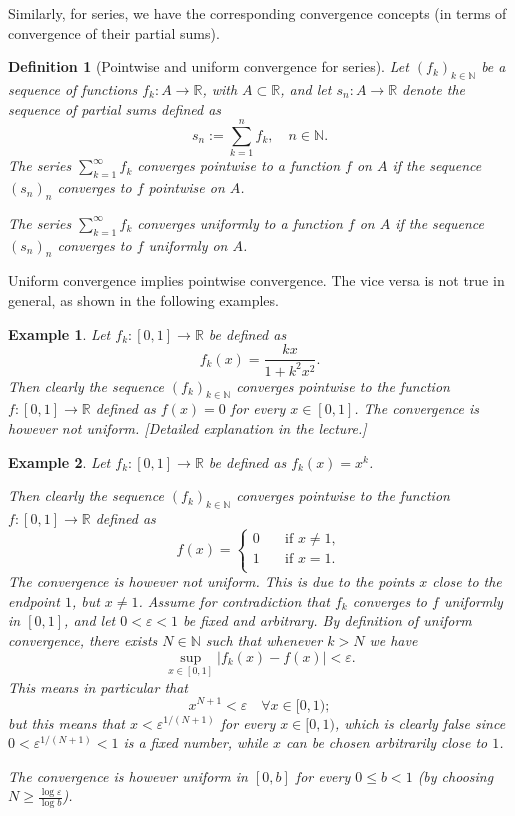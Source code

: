 \documentclass[a4paper,reqno]{amsart}
\numberwithin{equation}{section}
\newtheorem{definition}{Definition}[section]
\newtheorem{example}{Example}
\def\N{\mathbb{N}}
\def\R{\mathbb{R}}
\begin{document}
Similarly, for series, we have the corresponding convergence concepts (in terms of convergence of their partial sums). %

\begin{definition}[Pointwise and uniform convergence for series] Let $(f_k)_{k\in \mathbb{N}}$ be a sequence of functions $f_k:A \to \R$, with $A\subset \R$, and let $s_n:A\to \R$ denote the sequence of partial sums defined as
$$
s_n:= \sum_{k=1}^n f_k, \quad n\in \N.
$$
The series $\sum_{k=1}^\infty f_k$ converges pointwise to a function $f$ on $A$ if the sequence $(s_n)_n$ converges to $f$ pointwise on $A$.

The series $\sum_{k=1}^\infty f_k$ converges uniformly to a function $f$ on $A$ if the sequence $(s_n)_n$ converges to $f$ uniformly on $A$.
\end{definition}

Uniform convergence implies pointwise convergence. The vice versa is not true in general, as shown in the following examples.

\begin{example}\label{example:2}
Let $f_k: [0,1] \to \R$ be defined as
$$
f_k(x)= \frac{kx}{1+k^2x^2}.
$$
Then clearly the sequence $(f_k)_{k\in \N}$ converges pointwise to the function $f:[0,1] \to \R$ defined as $f(x) = 0$ for every $x\in [0,1]$.
The convergence is however not uniform. [Detailed explanation in the lecture.]
\end{example}


\begin{example}
Let $f_k: [0,1] \to \R$ be defined as $f_k(x)=x^k$.

Then clearly the sequence $(f_k)_{k\in \N}$ converges pointwise to the function $f:[0,1] \to \R$ defined as
$$
f(x) = \begin{cases}
0 \quad &\textrm{if } x\neq 1,\\
1 \quad &\textrm{if } x = 1.\\
\end{cases}
$$
The convergence is however not uniform. This is due to the points $x$ close to the endpoint $1$, but $x\neq 1$. Assume for contradiction that $f_k$ converges to $f$ uniformly in $[0,1]$, and let $0<\varepsilon<1$ be
fixed and arbitrary. By definition of uniform convergence, there exists $N\in \N$ such that whenever $k>N$ we have
$$
\sup_{x\in [0,1]} |f_k(x) - f(x)| <\varepsilon.
$$
This means in particular that
$$
x^{N+1} < \varepsilon \quad \forall x\in [0,1);
$$
but this means that $x<\varepsilon^{1/(N+1)}$ for every $x\in [0,1)$, which is clearly false since $0<\varepsilon^{1/(N+1)}<1$ is a fixed number, while $x$ can be chosen arbitrarily close to $1$.

\medskip

The convergence is however uniform in $[0,b]$ for every $0\leq b <1$ (by choosing $N \geq \frac{\log\varepsilon}{\log b}$).
\end{example}
\end{document}
